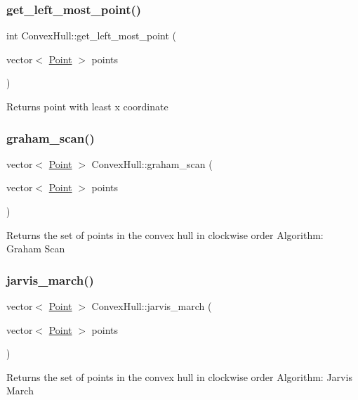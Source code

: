 \subsubsection{\texorpdfstring{get\+\_\+left\+\_\+most\+\_\+point()}{get\_left\_most\_point()}}
{\footnotesize\ttfamily int Convex\+Hull\+::get\+\_\+left\+\_\+most\+\_\+point (\begin{DoxyParamCaption}\item[{vector$<$ \hyperlink{classPoint}{Point} $>$}]{points }\end{DoxyParamCaption})\hspace{0.3cm}{\ttfamily [private]}}

Returns point with least x coordinate \mbox{\label{classConvexHull_aebe1ba6ff3c13d3e251aa6d16e743d78}} 
\subsubsection{\texorpdfstring{graham\+\_\+scan()}{graham\_scan()}}
{\footnotesize\ttfamily vector$<$ \hyperlink{classPoint}{Point} $>$ Convex\+Hull\+::graham\+\_\+scan (\begin{DoxyParamCaption}\item[{vector$<$ \hyperlink{classPoint}{Point} $>$}]{points }\end{DoxyParamCaption})}

Returns the set of points in the convex hull in clockwise order Algorithm\+: Graham Scan \mbox{\label{classConvexHull_a597bc298aeb5a60a931788d208767692}} 
\subsubsection{\texorpdfstring{jarvis\+\_\+march()}{jarvis\_march()}}
{\footnotesize\ttfamily vector$<$ \hyperlink{classPoint}{Point} $>$ Convex\+Hull\+::jarvis\+\_\+march (\begin{DoxyParamCaption}\item[{vector$<$ \hyperlink{classPoint}{Point} $>$}]{points }\end{DoxyParamCaption})}

Returns the set of points in the convex hull in clockwise order Algorithm\+: Jarvis\textquotesingle{} March \mbox{\label{classConvexHull_a4f446dacec06b823a438fa4acffb1f8f}} 
